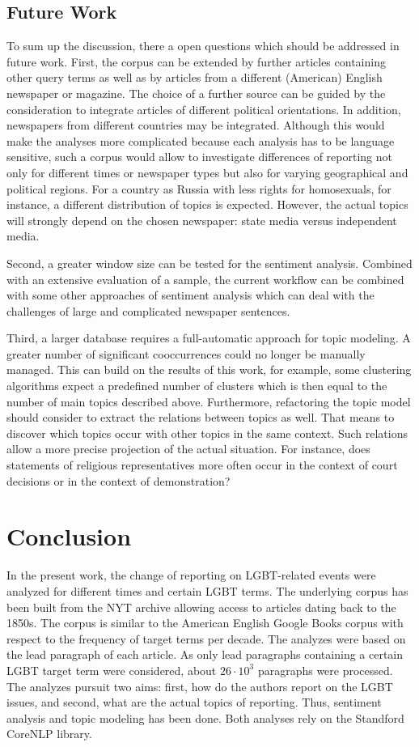 \documentclass[10pt,a4paper,twocolumn]{scrartcl}
\begin{document}
\subsection{Future Work}
To sum up the discussion, there a open questions which should be addressed in future work. First, the corpus can be extended by further articles containing other query terms as well as by articles from a different (American) English newspaper or magazine. The choice of a further source can be guided by the consideration to integrate articles of different political orientations. In addition, newspapers from different countries may be integrated. Although this would make the analyses more complicated because each analysis has to be language sensitive, such a corpus would allow to investigate differences of reporting not only for different times or newspaper types but also for varying geographical and political regions. For a country as Russia with less rights for homosexuals, for instance, a different distribution of topics is expected. However, the actual topics will strongly depend on the chosen newspaper: state media versus independent media.

Second, a greater window size can be tested for the sentiment analysis. Combined with an extensive evaluation of a sample, the current workflow can be combined with some other approaches of sentiment analysis which can deal with the challenges of large and complicated newspaper sentences.

Third, a larger database requires a full-automatic approach for topic modeling. A greater number of significant cooccurrences could no longer be manually managed. This can build on the results of this work, for example, some clustering algorithms expect a predefined number of clusters which is then equal to the number of main topics described above. Furthermore, refactoring the topic model should consider to extract the relations between topics as well. That means to discover which topics occur with other topics in the same context. Such relations allow a more precise projection of the actual situation. For instance, does statements of religious representatives more often occur in the context of court decisions or in the context of demonstration? 

\section{Conclusion}\label{sec:conclusion}
In the present work, the change of reporting on LGBT-related events were analyzed for different times and certain LGBT terms. The underlying corpus has been built from the NYT archive allowing access to articles dating back to the 1850s. The corpus is similar to the American English Google Books corpus with respect to the frequency of target terms per decade. The analyzes were based on the lead paragraph of each article. As only lead paragraphs containing a certain LGBT target term were considered, about $26\cdot 10^3$ paragraphs were processed. The analyzes pursuit two aims: first, how do the authors report on the LGBT issues, and second, what are the actual topics of reporting. Thus, sentiment analysis and topic modeling has been done. Both analyses rely on the Standford CoreNLP library.
\end{document}
